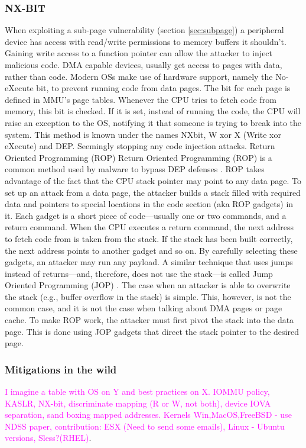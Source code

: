 \subsubsection{NX-BIT}\label{sec:nx-bit}
When exploiting a sub-page vulnerability (section \ref{sec:subpage}) a peripheral device has access with read/write permissions to memory buffers it shouldn't. Gaining write access to a function pointer can allow the attacker to inject malicious code. DMA capable devices, usually get access to pages with data, rather than code. Modern OSs make use of hardware support, namely the No-eXecute bit, to prevent running code from data pages. The bit for each page is defined in MMU’s page tables. Whenever the CPU tries to fetch code from memory, this bit is checked. If it is set, instead of running the code, the CPU will raise an exception to the OS, notifying it that someone is trying to break into the system. This method is known under the names NX\-bit, W xor X (Write xor eXecute) and DEP. Seemingly stopping any code injection attacks.\newline
Return Oriented Programming (ROP) Return Oriented Programming (ROP) is a common method used by malware to bypass DEP defenses \cite{RBSS12}. ROP takes advantage of the fact that the CPU stack pointer may point to any data page. To set up an attack from a data page, the attacker builds a stack filled with required data and pointers to special locations in the code section (aka ROP gadgets) in it. Each gadget is a short piece of code—usually one or two commands, and a return command. When the CPU executes a return command, the next address to fetch code from is taken from the stack. If the stack has been built correctly, the next address points to another gadget and so on. By carefully selecting these gadgets, an attacker may run any payload. A similar technique that uses jumps instead of returns—and, therefore, does not use the stack—is called Jump Oriented Programming (JOP) \cite{BJFL11}. The case when an attacker is able to overwrite the stack (e.g., buffer overflow in the stack) is simple. This, however, is not the common case, and it is not the case when talking about DMA pages or page cache. To make ROP work, the attacker must first pivot the stack into the data page. This is done using JOP gadgets that direct the stack pointer to the desired page.
\subsubsection{Mitigations in the wild}
\textcolor{magenta}{I imagine a table with OS on Y and best practices on X.
IOMMU policy, KASLR, NX-bit, discriminate mapping (R or W, not both), device IOVA separation, sand boxing mapped addresses.
Kernels Win,MacOS,FreeBSD - use NDSS paper, contribution: ESX (Need to send some emails), Linux - Ubuntu versions, Sless?(RHEL)}.